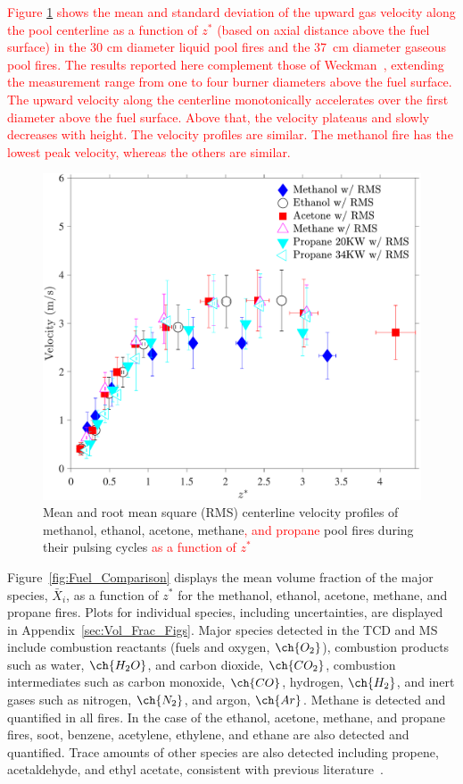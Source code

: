 \documentclass[12pt]{article}
\begin{document}
\textcolor{red}{Figure \ref{fig:Vel_Comparison} shows the mean and standard deviation of the upward gas velocity along the pool centerline as a function of $z^*$ (based on axial distance above the fuel surface) in the 30 cm diameter liquid pool fires and the 37~cm diameter gaseous pool fires. The results reported here complement those of Weckman~\cite{Weckman1996}, extending the measurement range from one to four burner diameters above the fuel surface.  The upward velocity along the centerline monotonically accelerates over the first diameter above the fuel surface.  Above that, the velocity plateaus and slowly decreases with height.    The velocity profiles are similar. The methanol fire has the lowest peak velocity, whereas the others are similar.}


\begin{figure}[h!]
	\centering
\includegraphics[width=10.0 cm, keepaspectratio]{Velocity_Comparison.pdf}
	\caption[Mean and RMS centerline velocity profiles]{Mean and root mean square (RMS) centerline velocity profiles of methanol, ethanol, acetone, methane\textcolor{red}{, and propane} pool fires during their pulsing cycles \textcolor{red}{ as a function of $z^*$}}
	\label{fig:Vel_Comparison}
\end{figure}

Figure~\ref{fig:Fuel_Comparison} displays the mean volume fraction of the major species, $\bar{X}_{i}$, as a function of $z^*$ for the methanol, ethanol, acetone, methane, and propane fires. Plots for individual species, including uncertainties, are displayed in Appendix~\ref{sec:Vol_Frac_Figs}. Major species detected in the TCD and MS include combustion reactants (fuels and oxygen, $\ch{O_2}$), combustion products such as water, $\ch{H_{2}O}$, and carbon dioxide, $\ch{CO_{2}}$, combustion intermediates such as carbon monoxide, $\ch{CO}$, hydrogen, $\ch{H_{2}}$, and inert gases such as nitrogen, $\ch{N_{2}}$, and argon, $\ch{Ar}$. Methane is detected and quantified in all fires. In the case of the ethanol, acetone, methane, and propane fires, soot, benzene, acetylene, ethylene, and ethane are also detected and quantified. Trace amounts of other species are also detected including propene, acetaldehyde, and ethyl acetate, consistent with previous literature~\cite{Pichon2009, Gong2015}.
\end{document}
